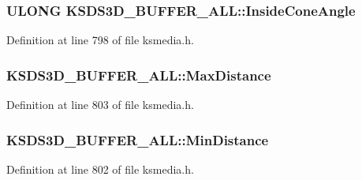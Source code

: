 \subsubsection[{\texorpdfstring{Inside\+Cone\+Angle}{InsideConeAngle}}]{\setlength{\rightskip}{0pt plus 5cm}U\+L\+O\+NG K\+S\+D\+S3\+D\+\_\+\+B\+U\+F\+F\+E\+R\+\_\+\+A\+L\+L\+::\+Inside\+Cone\+Angle}\hypertarget{struct_k_s_d_s3_d___b_u_f_f_e_r___a_l_l_a1b84fe42a970aaacd22b8a484642f677}{}\label{struct_k_s_d_s3_d___b_u_f_f_e_r___a_l_l_a1b84fe42a970aaacd22b8a484642f677}


Definition at line 798 of file ksmedia.\+h.

\subsubsection[{\texorpdfstring{Max\+Distance}{MaxDistance}}]{ K\+S\+D\+S3\+D\+\_\+\+B\+U\+F\+F\+E\+R\+\_\+\+A\+L\+L\+::\+Max\+Distance}\hypertarget{struct_k_s_d_s3_d___b_u_f_f_e_r___a_l_l_aa972f33423362ba384109cb86e54740d}{}\label{struct_k_s_d_s3_d___b_u_f_f_e_r___a_l_l_aa972f33423362ba384109cb86e54740d}


Definition at line 803 of file ksmedia.\+h.

\subsubsection[{\texorpdfstring{Min\+Distance}{MinDistance}}]{ K\+S\+D\+S3\+D\+\_\+\+B\+U\+F\+F\+E\+R\+\_\+\+A\+L\+L\+::\+Min\+Distance}\hypertarget{struct_k_s_d_s3_d___b_u_f_f_e_r___a_l_l_ac82c1f447b3e54c56b41f9b561bc5236}{}\label{struct_k_s_d_s3_d___b_u_f_f_e_r___a_l_l_ac82c1f447b3e54c56b41f9b561bc5236}


Definition at line 802 of file ksmedia.\+h.

